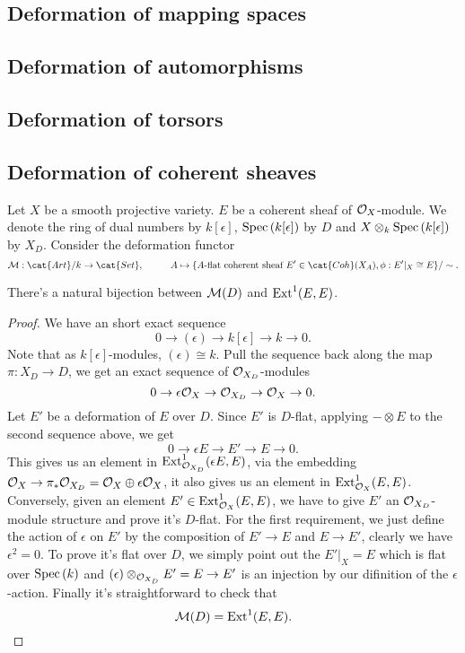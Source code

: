 \documentclass[../main.tex]{subfiles}
\begin{document}
\subsection{Deformation of mapping spaces}
\subsection{Deformation of automorphisms}
\subsection{Deformation of torsors}
\subsection{Deformation of coherent sheaves}
Let $X$ be a smooth projective variety. $E$ be a coherent sheaf of $\mathcal{O}_{X}$-module. We denote the ring of dual numbers by $k[\epsilon]$, $\operatorname{Spec\,}(k[\epsilon])$ by $D$ and $X\otimes_{k}\operatorname{Spec\,}(k[\epsilon])$ by $X_{D}$. Consider the deformation functor 
$$ \M: \cat{Art}/k \rightarrow \cat{Set},\hspace{1cm}A \mapsto \{A\text{-flat coherent sheaf } E'\in \cat{Coh}(X_{A}), \phi:E'|_{X}\cong E\}/\sim.
$$
\begin{theorem}
There's a natural bijection between $\mathcal{M}(D)$ and $\mathrm{Ext}^{1}(E, E)$. 
\end{theorem}
\begin{proof}
We have an short exact sequence 
$$0\rightarrow (\epsilon)\rightarrow k[\epsilon]\rightarrow k\rightarrow 0.$$
Note that as $k[\epsilon]$-modules, $(\epsilon)\cong k$. Pull the sequence back along the map $\pi:X_{D}\rightarrow D$, we get an exact sequence of $\mathcal{O}_{X_{D}}$-modules 
$$0\rightarrow \epsilon\mathcal{O}_{X}\rightarrow \mathcal{O}_{X_{D}}\rightarrow \mathcal{O}_{X}\rightarrow 0.$$
Let $E'$ be a deformation of $E$ over $D$. Since $E'$ is $D$-flat, applying $-\otimes E$ to the second sequence above, we get 
$$0\rightarrow \epsilon E\rightarrow E'\rightarrow E\rightarrow 0.$$
This gives us an element in $\mathrm{Ext}^{1}_{\mathcal{O}_{X_{D}}}(\epsilon E, E)$, via the embedding $\mathcal{O}_{X}\rightarrow \pi_{*}\mathcal{O}_{X_{D}}=\mathcal{O}_{X}\oplus \epsilon\mathcal{O}_{X}$, it also gives us an element in $\mathrm{Ext}^{1}_{\mathcal{O}_{X}}(E,E)$. Conversely, given an element $E'\in \mathrm{Ext}^{1}_{\mathcal{O}_{X}}(E, E)$, we have to give $E'$ an $\mathcal{O}_{X_{D}}$-module structure and prove it's $D$-flat. For the first requirement, we just define the action of $\epsilon$ on $E'$ by the composition of $E'\rightarrow E$ and $E\rightarrow E'$, clearly we have $\epsilon^{2}=0$. To prove it's flat over $D$, we simply point out the $E'|_{X}=E$ which is flat over $\operatorname{Spec\,}(k)$ and $(\epsilon)\otimes_{\mathcal{O}_{X_{D}}} E'=E\rightarrow E'$ is an injection by our difinition of the $\epsilon$-action. Finally it's straightforward to check that 
$$\mathcal{M}(D)=\mathrm{Ext}^{1}(E, E).$$
\end{proof}
\end{document}
